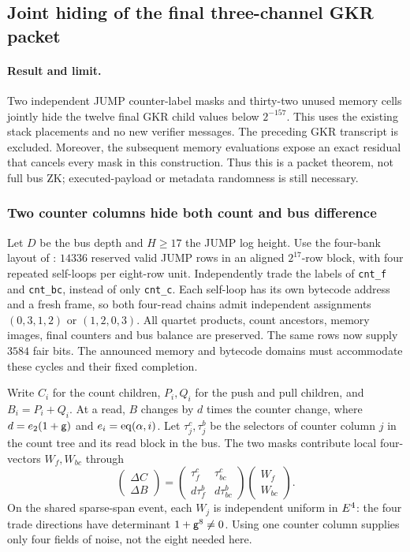 \subsection{Joint hiding of the final three-channel GKR packet}\label{note:zk-bus-packet}

\paragraph{Result and limit.} Two independent JUMP counter-label masks and thirty-two unused memory cells jointly hide the twelve final GKR child values below $2^{-157}$. This uses the existing stack placements and no new verifier messages. The preceding GKR transcript is excluded. Moreover, the subsequent memory evaluations expose an exact residual that cancels every mask in this construction. Thus this is a packet theorem, not full bus ZK; executed-payload or metadata randomness is still necessary.

\subsubsection{Two counter columns hide both count and bus difference}

Let $D$ be the bus depth and $H\ge17$ the JUMP log height. Use the four-bank layout of : $14336$ reserved valid JUMP rows in an aligned $2^{17}$-row block, with four repeated self-loops per eight-row unit. Independently trade the labels of \texttt{cnt\_f} and \texttt{cnt\_bc}, instead of only \texttt{cnt\_c}. Each self-loop has its own bytecode address and a fresh frame, so both four-read chains admit independent assignments $(0,3,1,2)$ or $(1,2,0,3)$. All quartet products, count ancestors, memory images, final counters and bus balance are preserved. The same rows now supply $3584$ fair bits. The announced memory and bytecode domains must accommodate these cycles and their fixed completion.

Write $C_i$ for the count children, $P_i,Q_i$ for the push and pull children, and $B_i=P_i+Q_i$. At a read, $B$ changes by $d$ times the counter change, where $d=e_2(1+\mathsf{g})$ and $e_i=\operatorname{eq}(\alpha,i)$. Let $\tau^c_j,\tau^b_j$ be the selectors of counter column $j$ in the count tree and its read block in the bus. The two masks contribute local four-vectors $W_f,W_{bc}$ through
\[
 \begin{pmatrix}\Delta C\\\Delta B\end{pmatrix}
 =\begin{pmatrix}\tau^c_f&\tau^c_{bc}\\d\tau^b_f&d\tau^b_{bc}\end{pmatrix}
   \begin{pmatrix}W_f\\W_{bc}\end{pmatrix}.
\]
On the shared sparse-span event, each $W_j$ is independent uniform in $E^4$: the four trade directions have determinant $1+\mathsf{g}^8\ne0$. Using one counter column supplies only four fields of noise, not the eight needed here.


